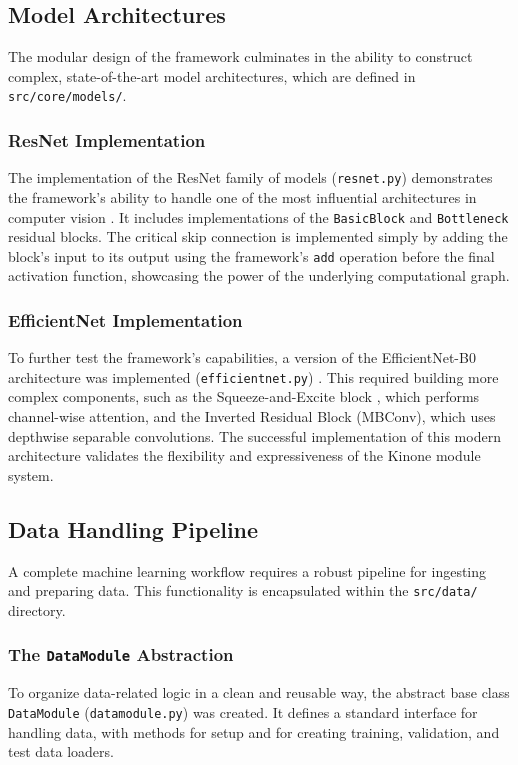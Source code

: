 \documentclass[a4paper]{article}
\begin{document}
\subsection{Model Architectures}

The modular design of the framework culminates in the ability to construct complex, state-of-the-art model architectures, which are defined in \texttt{src/core/models/}.

\subsubsection{ResNet Implementation}
The implementation of the ResNet family of models (\texttt{resnet.py}) demonstrates the framework's ability to handle one of the most influential architectures in computer vision \cite{he2016deep}. It includes implementations of the \texttt{BasicBlock} and \texttt{Bottleneck} residual blocks. The critical skip connection is implemented simply by adding the block's input to its output using the framework's \texttt{add} operation before the final activation function, showcasing the power of the underlying computational graph.

\subsubsection{EfficientNet Implementation}
To further test the framework's capabilities, a version of the EfficientNet-B0 architecture was implemented (\texttt{efficientnet.py}) \cite{tan2019efficientnet}. This required building more complex components, such as the Squeeze-and-Excite block \cite{hu2018squeeze}, which performs channel-wise attention, and the Inverted Residual Block (MBConv), which uses depthwise separable convolutions. The successful implementation of this modern architecture validates the flexibility and expressiveness of the Kinone module system.

\subsection{Data Handling Pipeline}

A complete machine learning workflow requires a robust pipeline for ingesting and preparing data. This functionality is encapsulated within the \texttt{src/data/} directory.

\subsubsection{The \texttt{DataModule} Abstraction}
To organize data-related logic in a clean and reusable way, the abstract base class \texttt{DataModule} (\texttt{datamodule.py}) was created. It defines a standard interface for handling data, with methods for setup and for creating training, validation, and test data loaders.
\end{document}
